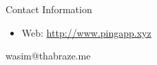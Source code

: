 \documentclass[final]{beamer}
\newlength{\onecolwid}
\begin{document}
\begin{frame}[t]
\begin{columns}[t]
\begin{column}{\onecolwid}
\begin{alertblock}{Contact Information}

\begin{itemize}
\item Web: \href{http://www.pingapp.xyz}{http://www.pingapp.xyz}
\end{itemize}
\item wasim@thabraze.me

\end{alertblock}



\end{column} %

\end{columns} %

\end{frame} %
\end{document}
